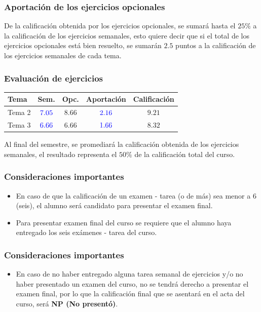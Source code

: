 \begin{frame}
\frametitle{Aportación de los ejercicios opcionales}
De la calificación obtenida por los ejercicios opcionales, se sumará hasta el $25\%$ a la calificación de los ejercicios semanales, esto quiere decir que si el total de los ejercicios opcionales está bien resuelto, se sumarán $2.5$ puntos a la calificación de los ejercicios semanales de cada tema.
\end{frame}  
\begin{frame}[fragile]
\frametitle{Evaluación de ejercicios}
\fontsize{12}{12}\selectfont
\begin{table}
\begin{tabular}{l c c c c}
Tema & Sem. & Opc. & Aportación & Calificación \\ \hline
Tema 2 & $\color{blue}{7.05}$ & $8.66$ & $\color{blue}{2.16}$ & $9.21$ \\ \hline
Tema 3 & $\color{blue}{6.66}$ & $6.66$ & $\color{blue}{1.66}$ & $8.32$ \\ \hline
\end{tabular}
\end{table}
\pause
\medskip
Al final del semestre, se promediará la calificación obtenida de los ejercicios semanales, el resultado representa el $50\%$ de la calificación total del curso.
\end{frame}
\begin{frame}
\frametitle{Consideraciones importantes}
\begin{itemize}
\setlength{\itemsep}{0mm}
\item En caso de que la calificación de un examen - tarea (o de más) sea menor a $6$ (seis), el alumno será candidato para presentar el examen final.
\item Para presentar examen final del curso se requiere que el alumno haya entregado los seis exámenes -  tarea del curso.
\end{itemize}
\end{frame}
\begin{frame}
\frametitle{Consideraciones importantes}
\begin{itemize}
\setlength{\itemsep}{0mm}
\item En caso de no haber entregado alguna tarea semanal de ejercicios y/o no haber presentado un examen del curso, no se tendrá derecho a presentar el examen final, por lo que la calificación final que se asentará en el acta del curso, será \textbf{NP (No presentó)}.
\end{itemize}
\end{frame}
